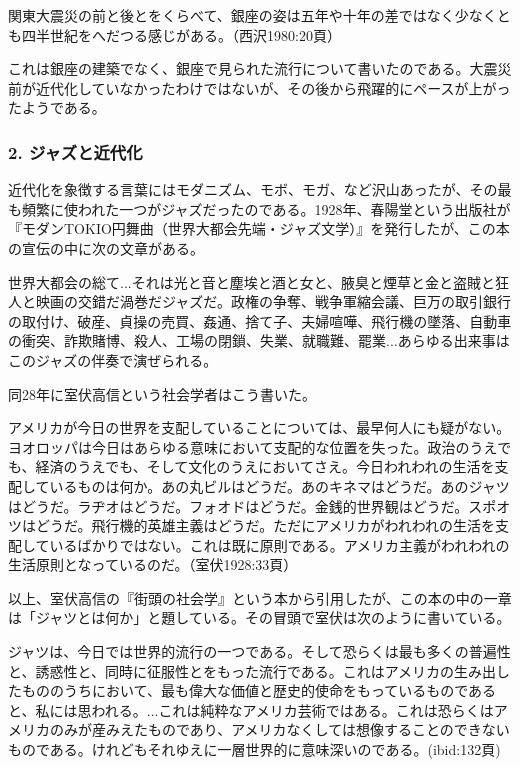 \begin{gquote}
関東大震災の前と後とをくらべて、銀座の姿は五年や十年の差ではなく少なくとも四半世紀をへだつる感じがある。（西沢1980:20頁）
\end{gquote}

これは銀座の建築でなく、銀座で見られた流行について書いたのである。大震災前が近代化していなかったわけではないが、その後から飛躍的にペースが上がったようである。

\subsubsection{2. ジャズと近代化}

近代化を象徴する言葉にはモダニズム、モボ、モガ、など沢山あったが、その最も頻繁に使われた一つがジャズだったのである。1928年、春陽堂という出版社が『モダンTOKIO円舞曲（世界大都会先端・ジャズ文学）』を発行したが、この本の宣伝の中に次の文章がある。

\begin{gquote}
世界大都会の総て...それは光と音と塵埃と酒と女と、腋臭と煙草と金と盗賊と狂人と映画の交錯だ渦巻だジャズだ。政権の争奪、戦争軍縮会議、巨万の取引銀行の取付け、破産、貞操の売買、姦通、捨て子、夫婦喧嘩、飛行機の墜落、自動車の衝突、詐欺賭博、殺人、工場の閉鎖、失業、就職難、罷業...あらゆる出来事はこのジャズの伴奏で演ぜられる。
\end{gquote}

同28年に室伏高信という社会学者はこう書いた。

\begin{gquote}
アメリカが今日の世界を支配していることについては、最早何人にも疑がない。ヨオロッパは今日はあらゆる意味において支配的な位置を失った。政治のうえでも、経済のうえでも、そして文化のうえにおいてさえ。今日われわれの生活を支配しているものは何か。あの丸ビルはどうだ。あのキネマはどうだ。あのジャツはどうだ。ラヂオはどうだ。フォオドはどうだ。金銭的世界観はどうだ。スポオツはどうだ。飛行機的英雄主義はどうだ。ただにアメリカがわれわれの生活を支配しているばかりではない。これは既に原則である。アメリカ主義がわれわれの生活原則となっているのだ。（室伏1928:33頁）
\end{gquote}

以上、室伏高信の『街頭の社会学』という本から引用したが、この本の中の一章は「ジャツとは何か」と題している。その冒頭で室伏は次のように書いている。

\begin{gquote}
ジャツは、今日では世界的流行の一つである。そして恐らくは最も多くの普遍性と、誘惑性と、同時に征服性とをもった流行である。これはアメリカの生み出したもののうちにおいて、最も偉大な価値と歴史的使命をもっているものであると、私には思われる。...これは純粋なアメリカ芸術ではある。これは恐らくはアメリカのみが産みえたものであり、アメリカなくしては想像することのできないものである。けれどもそれゆえに一層世界的に意味深いのである。(ibid:132頁)
\end{gquote}

